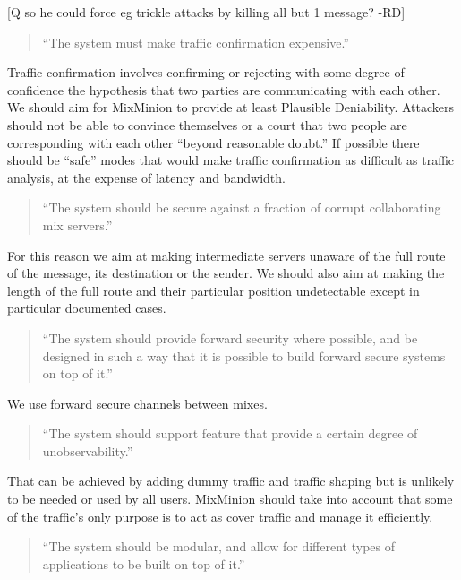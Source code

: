 \documentclass{article}
\begin{document}
[Q so he could force eg trickle attacks by killing all but 1 message? -RD]

\begin{quote}
     ``The system must make traffic confirmation expensive.''
\end{quote}

Traffic confirmation involves confirming or rejecting with some degree
of confidence the hypothesis that two parties are communicating with
each other. We should aim for MixMinion to provide at least Plausible 
Deniability. Attackers should not be able to convince themselves or a
court that two people are corresponding with each other ``beyond
reasonable doubt.'' If possible there should be ``safe'' modes that would 
make traffic confirmation as difficult as traffic analysis, at the
expense of latency and bandwidth.

\begin{quote}
     ``The system should be secure against a fraction of corrupt 
     collaborating mix servers.''
\end{quote}

For this reason we aim at making intermediate servers unaware of 
the full route of the message, its destination or the sender. We
should also aim at making the length of the full route and their
particular position undetectable except in particular documented
cases. 

\begin{quote}
     ``The system should provide forward security where possible, and be
     designed in such a way that it is possible to build forward
     secure systems on top of it.''
\end{quote}

We use forward secure channels between mixes. 

\begin{quote}
     ``The system should support feature that provide a certain degree
      of unobservability.''
\end{quote}

That can be achieved by adding dummy traffic and traffic shaping but
is unlikely to be needed or used by all users. MixMinion should take
into account that some of the traffic's only purpose is to act as
cover traffic and manage it efficiently.

\begin{quote}
     ``The system should be modular, and allow for different types of
     applications to be built on top of it.''
\end{quote}
\end{document}
